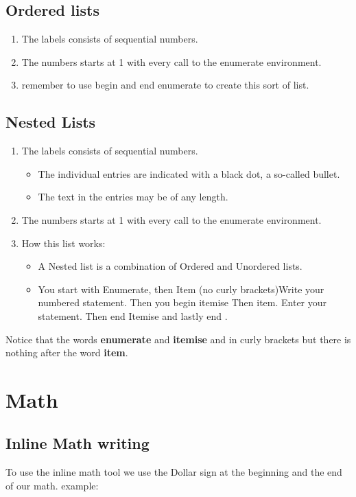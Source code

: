\documentclass[12pt,a4paper,landscape]{article}
\begin{document}
\begin{flushleft}
\subsection{Ordered lists}

\begin{enumerate}
\item The labels consists of sequential numbers.
\item The numbers starts at 1 with every call to the enumerate environment.
\item remember to use begin and end enumerate to create this sort of list. 
\end{enumerate}

\subsection{Nested Lists}

\begin{enumerate}
 \item The labels consists of sequential numbers.
 \begin{itemize}
 \item The individual entries are indicated with a black dot, a so-called bullet.
 \item The text in the entries may be of any length.
 \end{itemize}
 \item The numbers starts at 1 with every call to the enumerate environment.
 \item How this list works: 
 \begin{itemize}
 \item A Nested list is a combination of Ordered and Unordered lists. 
 \item You start with Enumerate, then Item (no curly brackets)Write your numbered statement. Then you begin itemise 
 Then item. Enter your statement. Then end Itemise and lastly end .
 \end{itemize}
\end{enumerate}
Notice that the words \textbf{enumerate} and \textbf{itemise} and in curly brackets but there is nothing after the word \textbf{item}.

\section{Math}
\subsection{Inline Math writing}
To use the inline math tool we use the Dollar sign at the beginning and the end of our math. example:


\end{flushleft}
\end{document}
